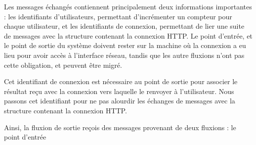 Les messages échangés contiennent principalement deux informations importantes : les identifiants d'utilisateurs, permettant d'incrémenter un compteur pour chaque utilisateur, et les identifiants de connexion, permettant de lier une suite de messages avec la structure contenant la connexion HTTP.
Le point d'entrée, et le point de sortie du système doivent rester sur la machine où la connexion a eu lieu pour avoir accès à l'interface réseau, tandis que les autre fluxions n'ont pas cette obligation, et peuvent être migré.


Cet identifiant de connexion est nécessaire au point de sortie pour associer le résultat reçu avec la connexion vers laquelle le renvoyer à l'utilisateur.
Nous passons cet identifiant pour ne pas alourdir les échanges de messages avec la structure contenant la connexion HTTP.

Ainsi, la fluxion de sortie reçois des messages provenant de deux fluxions : le point d'entrée




